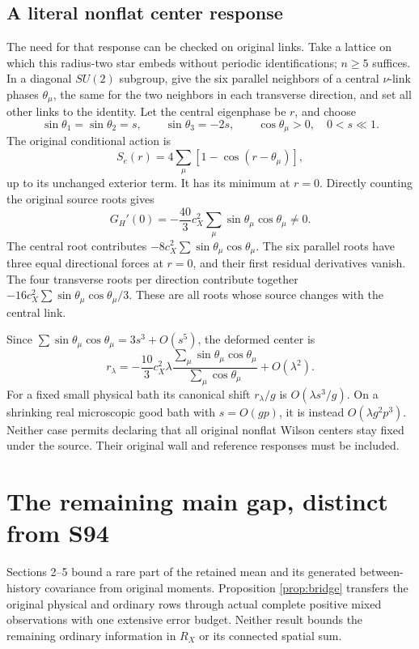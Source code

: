 \documentclass[11pt,letterpaper]{article}
\theoremstyle{remark}\newtheorem{remark}[theorem]{Remark}
\begin{document}
\subsection{A literal nonflat center response}

The need for that response can be checked on original links. Take a lattice on which this radius-two star embeds without periodic identifications; \(n\ge5\) suffices. In a diagonal \(SU(2)\) subgroup, give the six parallel neighbors of a central \(\nu\)-link phases \(\theta_\mu\), the same for the two neighbors in each transverse direction, and set all other links to the identity. Let the central eigenphase be \(r\), and choose
\[
 \sin\theta_1=\sin\theta_2=s,\qquad
 \sin\theta_3=-2s,\qquad \cos\theta_\mu>0,\quad 0<s\ll1.
\]
The original conditional action is
\[
 S_e(r)=4\sum_\mu[1-\cos(r-\theta_\mu)],
\]
up to its unchanged exterior term. It has its minimum at \(r=0\).
Directly counting the original source roots gives
\begin{equation}\label{eq:center}
 G_H'(0)=-\frac{40}{3}c_X^2
 \sum_\mu\sin\theta_\mu\cos\theta_\mu\ne0.
\end{equation}
The central root contributes \(-8c_X^2\sum\sin\theta_\mu\cos\theta_\mu\). The six parallel roots have three equal directional forces at \(r=0\), and their first residual derivatives vanish. The four transverse roots per direction contribute together
\(-16c_X^2\sum\sin\theta_\mu\cos\theta_\mu/3\). These are all roots whose source changes with the central link.

Since \(\sum\sin\theta_\mu\cos\theta_\mu=3s^3+O(s^5)\), the deformed center is
\[
 r_\lambda=
 -\frac{10}{3}c_X^2\lambda
 \frac{\sum_\mu\sin\theta_\mu\cos\theta_\mu}
      {\sum_\mu\cos\theta_\mu}
 +O(\lambda^2).
\]
For a fixed small physical bath its canonical shift \(r_\lambda/g\) is \(O(\lambda s^3/g)\). On a shrinking real microscopic good bath with \(s=O(gp)\), it is instead \(O(\lambda g^2p^3)\). Neither case permits declaring that all original nonflat Wilson centers stay fixed under the source. Their original wall and reference responses must be included.

\section{The remaining main gap, distinct from S94}

Sections 2--5 bound a rare part of the retained mean and its generated between-history covariance from original moments. Proposition \ref{prop:bridge} transfers the original physical and ordinary rows through actual complete positive mixed observations with one extensive error budget. Neither result bounds the remaining ordinary information in \(R_X\) or its connected spatial sum.
\end{document}
